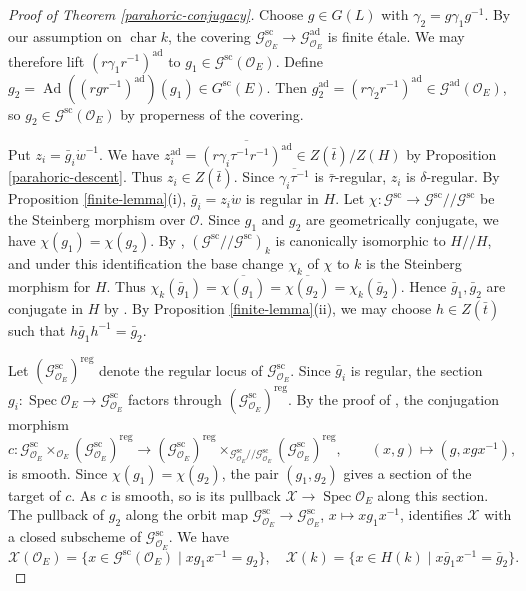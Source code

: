 \documentclass[12pt]{article}
\DeclareMathOperator{\ad}{ad}
\newcommand\cO{\mathcal O}
\newcommand\cG{\mathcal G}
\theoremstyle{definition}
\newcommand{\scs}{\mathrm{sc}}
\newcommand{\reg}{\mathrm{reg}}
\begin{document}
\begin{proof}[Proof of Theorem \ref{parahoric-conjugacy}]
Choose $g\in G(L)$ with $\gamma_2=g\gamma_1g^{-1}$. By our assumption on $\operatorname{char}k$, the covering $\cG^{\scs}_{\cO_E}\to \cG^{\ad}_{\cO_E}$ is finite \'etale.
We may therefore lift $(r\gamma_1r^{-1})^{\ad}$ to $g_1\in \cG^{\scs}(\cO_E)$. Define $g_2=\operatorname{Ad}((rgr^{-1})^{\ad})(g_1)\in G^{\scs}(E)$. Then $g_2^{\ad}=(r\gamma_2r^{-1})^{\ad}\in \cG^{\ad}(\cO_E)$, so $g_2\in \cG^{\scs}(\cO_E)$ by properness of the covering.

Put $z_i=\bar g_i\dot w^{-1}$. We have $z_i^{\ad}=\overline{(r\gamma_i\tau^{-1}r^{-1})^{\ad}}\in Z(\bar t)/Z(H)$ by Proposition \ref{parahoric-descent}. Thus $z_i\in Z(\bar t)$. Since $\overline{\gamma_i\tau^{-1}}$ is $\bar\tau$-regular, $z_i$ is $\delta$-regular.
By Proposition \ref{finite-lemma}(i), $\bar g_i=z_i\dot w$ is regular in $H$. Let $\chi:\cG^{\scs}\to\cG^{\scs}/\!/\cG^{\scs}$ be the Steinberg morphism over $\cO$. Since $g_1$ and $g_2$ are geometrically conjugate, we have $\chi(g_1)=\chi(g_2)$. By \cite[Theorem 4.1(1)]{Lee15}, $(\cG^{\scs}/\!/\cG^{\scs})_k$ is canonically isomorphic to $H/\!/H$, and under this identification the base change $\chi_k$ of $\chi$ to $k$ is the Steinberg morphism for $H$. Thus $\chi_k(\bar g_1)=\overline{\chi(g_1)}=\overline{\chi(g_2)}=\chi_k(\bar g_2)$. Hence $\bar g_1,\bar g_2$ are conjugate in $H$ by \cite[Theorem 6.11(c)]{Steinberg65}.
By Proposition \ref{finite-lemma}(ii), we may choose $h\in Z(\bar t)$ such that $h\bar g_1h^{-1}=\bar g_2$.

Let $(\cG^{\scs}_{\cO_E})^{\reg}$ denote the regular locus of $\cG^{\scs}_{\cO_E}$.
Since $\bar g_i$ is regular, the section $g_i\colon\operatorname{Spec}\cO_E\to\cG^{\scs}_{\cO_E}$ factors through $(\cG^{\scs}_{\cO_E})^{\reg}$.
By the proof of \cite[Theorem 3.7]{Shotton24}, the conjugation morphism
$$
c\colon \cG^{\scs}_{\cO_E}\times_{\cO_E}(\cG^{\scs}_{\cO_E})^{\reg}
\longrightarrow
(\cG^{\scs}_{\cO_E})^{\reg}\times_{\cG^{\scs}_{\cO_E}/\!/\cG^{\scs}_{\cO_E}}(\cG^{\scs}_{\cO_E})^{\reg},
\qquad (x,g)\longmapsto (g,xgx^{-1}),
$$
is smooth.
Since $\chi(g_1)=\chi(g_2)$, the pair $(g_1,g_2)$ gives a section of the target of $c$.
As $c$ is smooth, so is its pullback $\mathcal X\to\operatorname{Spec}\cO_E$ along this section.
The pullback of $g_2$ along the orbit map $\cG^{\scs}_{\cO_E}\to\cG^{\scs}_{\cO_E}$, $x\mapsto xg_1x^{-1}$, identifies $\mathcal X$ with a closed subscheme of $\cG^{\scs}_{\cO_E}$.
We have
$$
\mathcal X(\cO_E)=\{x\in\cG^{\scs}(\cO_E)\mid xg_1x^{-1}=g_2\},\quad \mathcal X(k)=\{x\in H(k)\mid x\bar g_1x^{-1}=\bar g_2\}.
$$


\end{proof}
\end{document}
